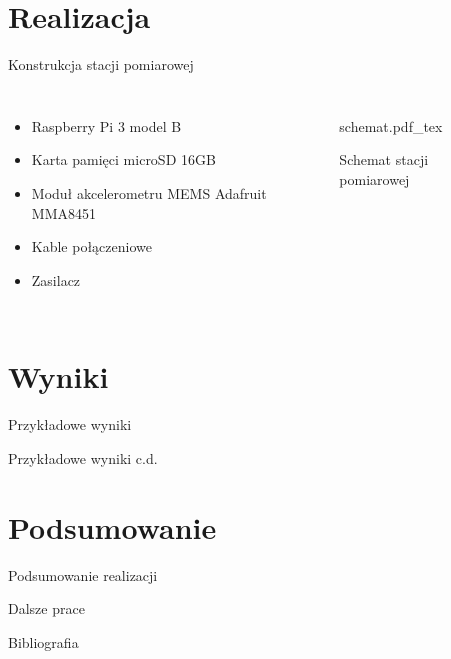 \documentclass[aspectratio=1610,polish]{beamer} %
\begin{document}
  \section{Realizacja}
  \begin{frame}{Konstrukcja stacji pomiarowej}
    \begin{columns}
      \begin{itemize}
	\item Raspberry Pi 3 model B
	\item Karta pamięci microSD 16GB
	\item Moduł akcelerometru MEMS Adafruit MMA8451
	\item Kable połączeniowe
	\item Zasilacz
      \end{itemize}
      \begin{figure}
	{schemat.pdf_tex}
	\caption{Schemat stacji pomiarowej}
      \end{figure}
    \end{columns}

  \end{frame}
  \begin{frame}{}

  \end{frame}
  \section{Wyniki}
  \begin{frame}{Przykładowe wyniki}
    \begin{figure}
      
    \end{figure}
  \end{frame}
  \begin{frame}{Przykładowe wyniki c.d.}
    \begin{figure}
      
    \end{figure}
  \end{frame}
  \section{Podsumowanie}
  \begin{frame}{Podsumowanie realizacji}

  \end{frame}
  \begin{frame}{Dalsze prace}

  \end{frame}
  \begin{frame}[allowframebreaks]{Bibliografia}
    \nocite{*}
    \printbibliography
  \end{frame}
\end{document}
